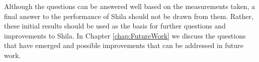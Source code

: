 Although the questions can be answered well based on the measurements taken, a final answer to the performance of Shila should not be drawn from them. Rather, these initial results should be used as the basis for further questions and improvements to Shila. In Chapter \ref{chap:FutureWork} we discuss the questions that have emerged and possible improvements that can be addressed in future work.  